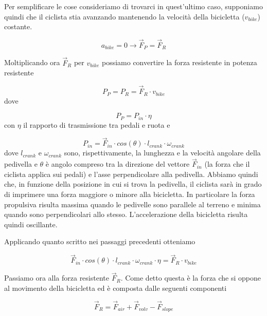 \documentclass[class=article]{standalone}
\begin{document}
	Per semplificare le cose consideriamo di trovarci in quest'ultimo caso, supponiamo quindi che il ciclista stia avanzando mantenendo la velocità della bicicletta (\(v_{bike}\)) costante.
		
	\[a_{bike}=0 \rightarrow \vec{F}_{P}=\vec{F}_{R}\]
	
	Moltiplicando ora \(\vec{F}_{R}\) per \(v_{bike}\) possiamo convertire la forza resistente in potenza resistente
	
	\[P_{P}=P_{R}=\vec{F}_{R}\cdot v_{bike}\]
	dove 
	
	\[P_{P}=P_{in}\cdot\eta\]
	con \(\eta\) il rapporto di trasmissione tra pedali e ruota e
	
	\[P_{in}=\vec{F}_{in}\cdot cos(\theta)\cdot l_{crank}\cdot\omega_{crank}\]
	dove \(l_{crank}\) e \(\omega_{crank}\) sono, rispettivamente, la lunghezza e la velocità angolare della pedivella e \(\theta\) è angolo compreso tra la direzione del vettore \(\vec{F}_{in}\) (la forza che il ciclista applica sui pedali) e l'asse perpendicolare alla pedivella. Abbiamo quindi che, in funzione della posizione in cui si trova la pedivella, il ciclista sarà in grado di imprimere una forza maggiore o minore alla bicicletta. In particolare la forza propulsiva risulta massima quando le pedivelle sono parallele al terreno e minima quando sono perpendicolari allo stesso. L'accelerazione della bicicletta risulta quindi oscillante.
	
	Applicando quanto scritto nei passaggi precedenti otteniamo
	
	\[\vec{F}_{in}\cdot cos(\theta)\cdot l_{crank}\cdot \omega_{crank}\cdot\eta=\vec{F}_{R}\cdot v_{bike}\]
	
	Passiamo ora alla forza resistente \(\vec{F}_{R}\). Come detto questa è la forza che si oppone al movimento della bicicletta ed è composta dalle seguenti componenti
	
	\[\vec{F}_{R}=\vec{F}_{air}+\vec{F}_{volv}-\vec{F}_{slope}\]
	
\end{document}
